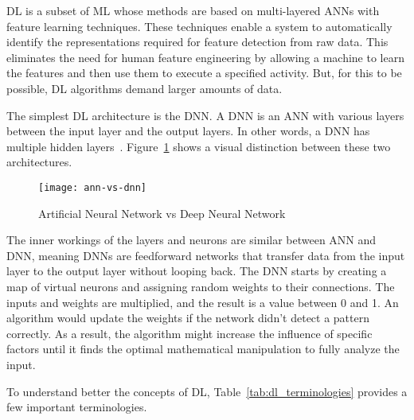 \gls{DL} is a subset of \gls{ML} whose methods are based on multi-layered \gls{ANN}s with feature learning techniques. These techniques enable a system to automatically identify the representations required for feature detection from raw data. This eliminates the need for human feature engineering by allowing a machine to learn the features and then use them to execute a specified activity. But, for this to be possible, \gls{DL} algorithms demand larger amounts of data.

The simplest \gls{DL} architecture is the \gls{DNN}. A \gls{DNN} is an \gls{ANN} with various layers between the input layer and the output layers. In other words, a \gls{DNN} has multiple hidden layers~\cite{Schmidhuber2015DeepOverview}. Figure~\ref{fig:ann-vs-dnn} shows a visual distinction between these two architectures.

\begin{figure}[htbp]
    \centering
    \texttt{[image: ann-vs-dnn]}
    \caption{Artificial Neural Network vs Deep Neural Network}
    \label{fig:ann-vs-dnn}
\end{figure}

The inner workings of the layers and neurons are similar between \gls{ANN} and \gls{DNN}, meaning \gls{DNN}s are feedforward networks that transfer data from the input layer to the output layer without looping back. The \gls{DNN} starts by creating a map of virtual neurons and assigning random weights to their connections. The inputs and weights are multiplied, and the result is a value between 0 and 1. An algorithm would update the weights if the network didn't detect a pattern correctly. As a result, the algorithm might increase the influence of specific factors until it finds the optimal mathematical manipulation to fully analyze the input.

To understand better the concepts of \gls{DL}, Table~\ref{tab:dl_terminologies} provides a few important terminologies.


